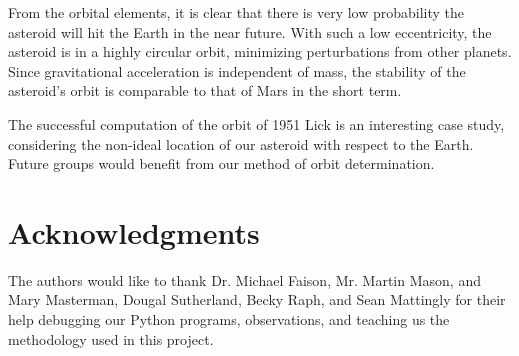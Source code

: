 \documentclass[11pt,a4paper]{article}
\begin{document}
From the orbital elements, it is clear that there is very low probability the asteroid will hit the Earth in the near future.
With such a low eccentricity, the asteroid is in a highly circular orbit, minimizing perturbations from other planets.
Since gravitational acceleration is independent of mass, the stability of the asteroid's orbit is comparable to that of Mars in the short term.

The successful computation of the orbit of 1951 Lick is an interesting case study, considering the non-ideal location of our asteroid with respect to the Earth.
Future groups would benefit from our method of orbit determination.

\section*{Acknowledgments}

The authors would like to thank Dr. Michael Faison, Mr. Martin Mason, and Mary Masterman, Dougal Sutherland, Becky Raph, and Sean Mattingly for their help debugging our Python programs, observations, and teaching us the methodology used in this project.

\end{document}
